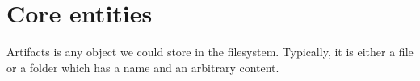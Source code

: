 \section{Core entities}

Artifacts is any object we could store in the filesystem. Typically, it is
either a file or a folder which has a name and an arbitrary content.













